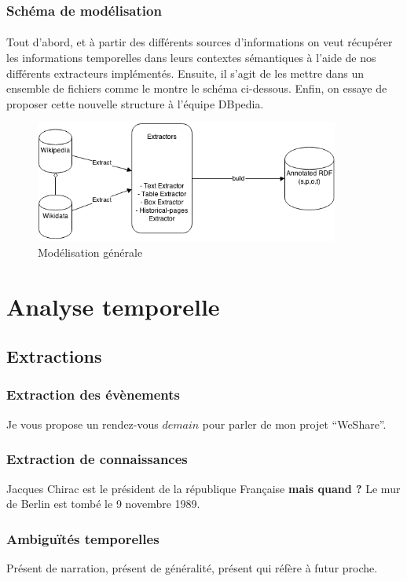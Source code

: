 \subsubsection*{Schéma de modélisation}
\paragraph{}
Tout d’abord, et à partir des différents sources d’informations on veut récupérer les informations temporelles dans leurs contextes sémantiques à l’aide de nos différents extracteurs implémentés. 
Ensuite,  il s’agit de les mettre dans un ensemble de fichiers comme le montre le schéma ci-dessous.
Enfin, on essaye de proposer cette nouvelle structure à l’équipe DBpedia.
\begin{figure}[H]
        \centering
                \centering
                \includegraphics[width=10cm]{modelisation.png}
               \caption{Modélisation générale}

\end{figure}
\section*{Analyse temporelle}
\subsection*{Extractions}
\subsubsection*{Extraction des évènements}
Je vous propose un rendez-vous $demain$ pour parler de mon projet “WeShare”.
\subsubsection*{Extraction de connaissances}
Jacques Chirac est le président de la république Française \textbf{ mais quand ?}
\newline
Le mur de Berlin est tombé le 9 novembre 1989. 
\subsubsection*{Ambiguïtés temporelles}
Présent de narration, présent de généralité, présent qui réfère à futur proche.
